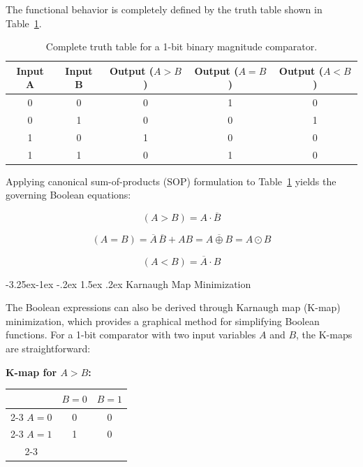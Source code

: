 \documentclass[12pt,a4paper,oneside]{report}
\makeatletter
\renewcommand\subsection{\@startsection{subsection}{2}{\z@}%
                                     {-3.25ex\@plus -1ex \@minus -.2ex}%
                                     {1.5ex \@plus .2ex}%
                                     {\normalfont\normalsize\bfseries\itshape}}
\makeatother
\begin{document}
The functional behavior is completely defined by the truth table shown in Table~\ref{tab:lit_truthtable}.

\begin{table}[H]
\centering
\caption{Complete truth table for a 1-bit binary magnitude comparator.}
\label{tab:lit_truthtable}
\vspace{0.2cm}
\begin{tabular}{|c|c|c|c|c|}
\hline
\textbf{Input A} & \textbf{Input B} & \textbf{Output ($A>B$)} & \textbf{Output ($A=B$)} & \textbf{Output ($A<B$)} \\
\hline
0 & 0 & 0 & 1 & 0 \\
\hline
0 & 1 & 0 & 0 & 1 \\
\hline
1 & 0 & 1 & 0 & 0 \\
\hline
1 & 1 & 0 & 1 & 0 \\
\hline
\end{tabular}
\end{table}

Applying canonical sum-of-products (SOP) formulation to Table~\ref{tab:lit_truthtable} yields the governing Boolean equations:

\begin{equation}
(A > B) = A \cdot \overline{B}
\label{eq:lit_agb}
\end{equation}

\begin{equation}
(A = B) = \overline{A}\,\overline{B} + A B = \overline{A \oplus B} = A \odot B
\label{eq:lit_aeb}
\end{equation}

\begin{equation}
(A < B) = \overline{A} \cdot B
\label{eq:lit_alb}
\end{equation}

\subsection{Karnaugh Map Minimization}

The Boolean expressions can also be derived through Karnaugh map (K-map) minimization, which provides a graphical method for simplifying Boolean functions. For a 1-bit comparator with two input variables $A$ and $B$, the K-maps are straightforward:

\noindent\textbf{K-map for $A > B$:}

\begin{center}
\begin{tabular}{c|c|c|}
\multicolumn{1}{c}{} & \multicolumn{1}{c}{$B=0$} & \multicolumn{1}{c}{$B=1$} \\
\cline{2-3}
$A=0$ & 0 & 0 \\
\cline{2-3}
$A=1$ & 1 & 0 \\
\cline{2-3}
\end{tabular}
\end{center}
\end{document}

